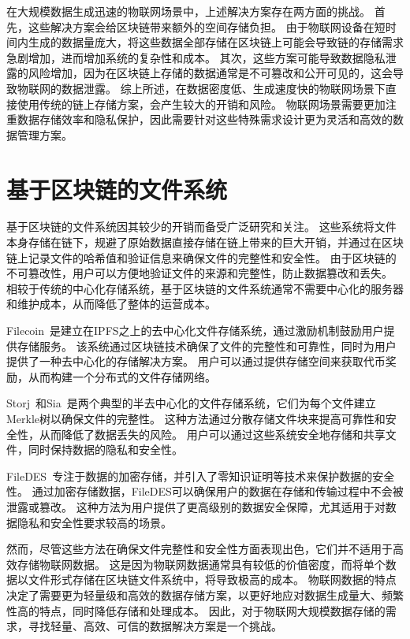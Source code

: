在大规模数据生成迅速的物联网场景中，上述解决方案存在两方面的挑战。
首先，这些解决方案会给区块链带来额外的空间存储负担。
由于物联网设备在短时间内生成的数据量庞大，将这些数据全部存储在区块链上可能会导致链的存储需求急剧增加，进而增加系统的复杂性和成本。
其次，这些方案可能导致数据隐私泄露的风险增加，因为在区块链上存储的数据通常是不可篡改和公开可见的，这会导致物联网的数据泄露。
综上所述，在数据密度低、生成速度快的物联网场景下直接使用传统的链上存储方案，会产生较大的开销和风险。
物联网场景需要更加注重数据存储效率和隐私保护，因此需要针对这些特殊需求设计更为灵活和高效的数据管理方案。

\section{基于区块链的文件系统}
基于区块链的文件系统因其较少的开销而备受广泛研究和关注。
这些系统将文件本身存储在链下，规避了原始数据直接存储在链上带来的巨大开销，并通过在区块链上记录文件的哈希值和验证信息来确保文件的完整性和安全性。
由于区块链的不可篡改性，用户可以方便地验证文件的来源和完整性，防止数据篡改和丢失。
相较于传统的中心化存储系统，基于区块链的文件系统通常不需要中心化的服务器和维护成本，从而降低了整体的运营成本。

Filecoin~\cite{bauer2022filecoin}是建立在IPFS之上的去中心化文件存储系统，通过激励机制鼓励用户提供存储服务。
该系统通过区块链技术确保了文件的完整性和可靠性，同时为用户提供了一种去中心化的存储解决方案。
用户可以通过提供存储空间来获取代币奖励，从而构建一个分布式的文件存储网络。

Storj~\cite{storj2018storj}和Sia~\cite{vorick2014sia}是两个典型的半去中心化的文件存储系统，它们为每个文件建立Merkle树以确保文件的完整性。
这种方法通过分散存储文件块来提高可靠性和安全性，从而降低了数据丢失的风险。
用户可以通过这些系统安全地存储和共享文件，同时保持数据的隐私和安全性。

FileDES~\cite{xu2024filedes}专注于数据的加密存储，并引入了零知识证明等技术来保护数据的安全性。
通过加密存储数据，FileDES可以确保用户的数据在存储和传输过程中不会被泄露或篡改。
这种方法为用户提供了更高级别的数据安全保障，尤其适用于对数据隐私和安全性要求较高的场景。

然而，尽管这些方法在确保文件完整性和安全性方面表现出色，它们并不适用于高效存储物联网数据。
这是因为物联网数据通常具有较低的价值密度，而将单个数据以文件形式存储在区块链文件系统中，将导致极高的成本。
物联网数据的特点决定了需要更为轻量级和高效的数据存储方案，以更好地应对数据生成量大、频繁性高的特点，同时降低存储和处理成本。
因此，对于物联网大规模数据存储的需求，寻找轻量、高效、可信的数据解决方案是一个挑战。

